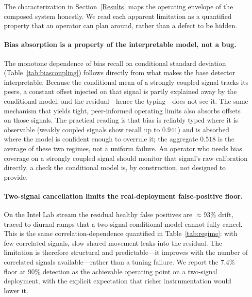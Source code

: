 The characterization in Section~\ref{Results} maps the operating envelope of the composed system honestly. We read each apparent limitation as a quantified property that an operator can plan around, rather than a defect to be hidden.

\paragraph{Bias absorption is a property of the interpretable model, not a bug.}
The monotone dependence of bias recall on conditional standard deviation (Table~\ref{tab:biascoupling}) follows directly from what makes the base detector interpretable. Because the conditional mean of a strongly coupled signal tracks its peers, a constant offset injected on that signal is partly explained away by the conditional model, and the residual---hence the typing---does not see it. The same mechanism that yields tight, peer-informed operating limits also absorbs offsets on those signals. The practical reading is that bias is reliably typed where it is observable (weakly coupled signals show recall up to $0.941$) and is absorbed where the model is confident enough to overrule it; the aggregate $0.518$ is the average of these two regimes, not a uniform failure. An operator who needs bias coverage on a strongly coupled signal should monitor that signal's raw calibration directly, a check the conditional model is, by construction, not designed to provide.

\paragraph{Two-signal cancellation limits the real-deployment false-positive floor.}
On the Intel Lab stream the residual healthy false positives are $\approx 93\%$ drift, traced to diurnal ramps that a two-signal conditional model cannot fully cancel. This is the same correlation-dependence quantified in Table~\ref{tab:regime}: with few correlated signals, slow shared movement leaks into the residual. The limitation is therefore structural and predictable---it improves with the number of correlated signals available---rather than a tuning failure. We report the $7.4\%$ floor at $90\%$ detection as the achievable operating point on a two-signal deployment, with the explicit expectation that richer instrumentation would lower it.

